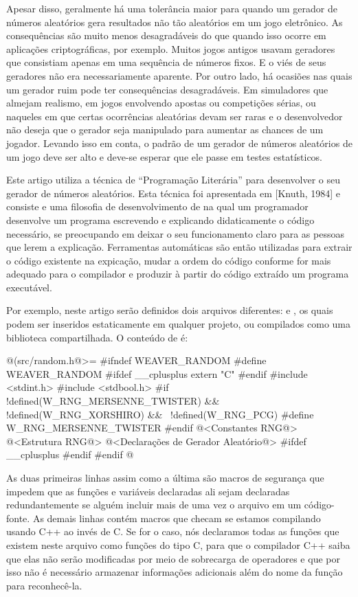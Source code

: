 Apesar disso, geralmente há uma tolerância maior para quando um
gerador de números aleatórios gera resultados não tão aleatórios em um
jogo eletrônico. As consequências são muito menos desagradáveis do que
quando isso ocorre em aplicações criptográficas, por exemplo. Muitos
jogos antigos usavam geradores que consistiam apenas em uma sequência
de números fixos. E o viés de seus geradores não era necessariamente
aparente. Por outro lado, há ocasiões nas quais um gerador ruim pode
ter consequências desagradáveis. Em simuladores que almejam realismo,
em jogos envolvendo apostas ou competições sérias, ou naqueles em que
certas ocorrências aleatórias devam ser raras e o desenvolvedor não
deseja que o gerador seja manipulado para aumentar as chances de um
jogador. Levando isso em conta, o padrão de um gerador de números
aleatórios de um jogo deve ser alto e deve-se esperar que ele passe em
testes estatísticos.


Este artigo utiliza a técnica de ``Programação Literária'' para
desenvolver o seu gerador de números aleatórios. Esta técnica foi apresentada
em [Knuth, 1984] e consiste e uma filosofia de desenvolvimento de
 na qual um programador desenvolve um programa escrevendo
e explicando didaticamente o código necessário, se preocupando em
deixar o seu funcionamento claro para as pessoas que lerem a
explicação. Ferramentas automáticas são então utilizadas para extrair
o código existente na expicação, mudar a ordem do código conforme for
mais adequado para o compilador e produzir à partir do código extraído
um programa executável.

Por exemplo, neste artigo serão definidos dois arquivos
diferentes:  e , os quais
podem ser inseridos estaticamente em qualquer projeto, ou compilados
como uma biblioteca compartilhada. O conteúdo de 
é:

\iniciocodigo
@(src/random.h@>=
#ifndef WEAVER_RANDOM
#define WEAVER_RANDOM
#ifdef __cplusplus
extern "C" {
#endif
#include <stdint.h>
#include <stdbool.h>
#if !defined(W_RNG_MERSENNE_TWISTER) && !defined(W_RNG_XORSHIRO) && \
!defined(W_RNG_PCG)
#define W_RNG_MERSENNE_TWISTER
#endif
@<Constantes RNG@>
@<Estrutura RNG@>
@<Declarações de Gerador Aleatório@>
#ifdef __cplusplus
}
#endif
#endif
@
\fimcodigo

As duas primeiras linhas assim como a última são macros de segurança
que impedem que as funções e variáveis declaradas ali sejam declaradas
redundantemente se alguém incluir mais de uma vez o arquivo em um
código-fonte. As demais linhas contém macros que checam se estamos
compilando usando C++ ao invés de C. Se for o caso, nós declaramos
todas as funções que existem neste arquivo como funções do tipo C,
para que o compilador C++ saiba que elas não serão modificadas por
meio de sobrecarga de operadores e que por isso não é necessário
armazenar informações adicionais além do nome da função para
reconhecê-la.

